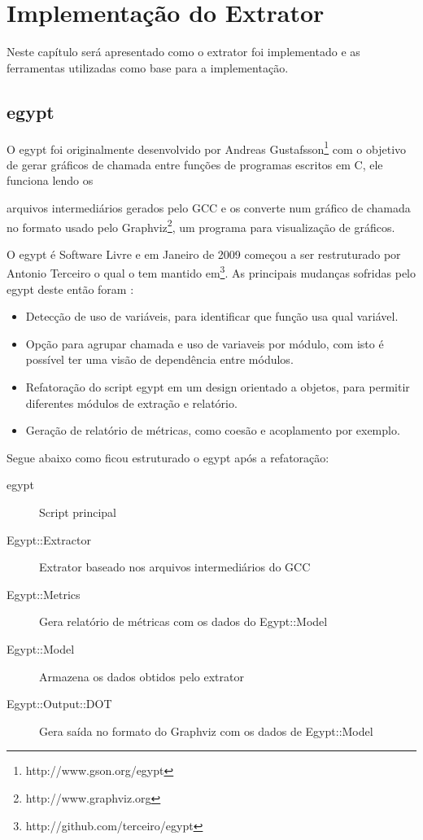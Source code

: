 
\chapter{Implementação do Extrator} \label{ch:implementacao}

Neste capítulo será apresentado como o extrator foi implementado e as
ferramentas utilizadas como base para a implementação.

\section{egypt} \label{sec:egypt}

O egypt foi originalmente desenvolvido por Andreas
Gustafsson\footnote{http://www.gson.org/egypt} com o objetivo de gerar gráficos
de chamada entre funções de programas escritos em C, ele funciona lendo os

arquivos intermediários gerados pelo GCC e os converte num gráfico de chamada
no formato usado pelo Graphviz\footnote{http://www.graphviz.org}, um programa
para visualização de gráficos.

O egypt é Software Livre e em Janeiro de 2009 começou a ser restruturado por
Antonio Terceiro o qual o tem mantido
em\footnote{http://github.com/terceiro/egypt}. As principais mudanças sofridas
pelo egypt deste então foram \cite{structuralComplexityEvolution}:

\begin{itemize}
\item Detecção de uso de variáveis, para identificar que função usa qual
variável.
\item Opção para agrupar chamada e uso de variaveis por módulo, com isto é
possível ter uma visão de dependência entre módulos.
\item Refatoração do script egypt em um design orientado a objetos, para
permitir diferentes módulos de extração e relatório.
\item Geração de relatório de métricas, como coesão e acoplamento por exemplo.
\end{itemize}

Segue abaixo como ficou estruturado o egypt após a refatoração:

\begin{description}
\item[egypt] Script principal
\item[Egypt::Extractor] Extrator baseado nos arquivos intermediários do GCC
\item[Egypt::Metrics] Gera relatório de métricas com os dados do Egypt::Model
\item[Egypt::Model] Armazena os dados obtidos pelo extrator
\item[Egypt::Output::DOT] Gera saída no formato do Graphviz com os dados de Egypt::Model
\end{description}

